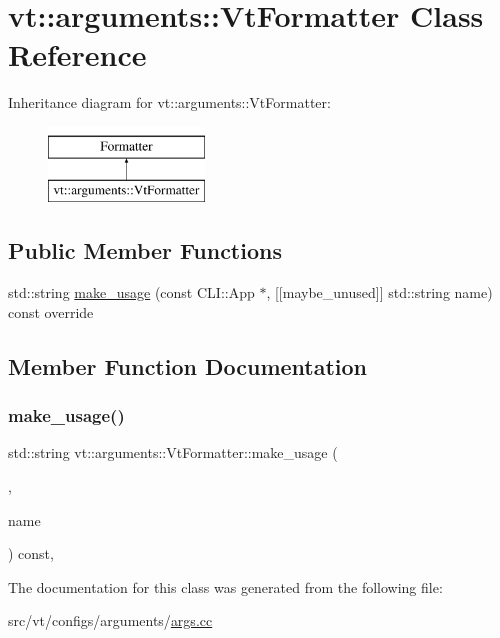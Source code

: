\hypertarget{classvt_1_1arguments_1_1_vt_formatter}{}\section{vt\+:\+:arguments\+:\+:Vt\+Formatter Class Reference}
\label{classvt_1_1arguments_1_1_vt_formatter}
Inheritance diagram for vt\+:\+:arguments\+:\+:Vt\+Formatter\+:\begin{figure}[H]
\begin{center}
\leavevmode
\includegraphics[height=2.000000cm]{classvt_1_1arguments_1_1_vt_formatter}
\end{center}
\end{figure}
\subsection*{Public Member Functions}
\begin{DoxyCompactItemize}
\item 
std\+::string \hyperlink{classvt_1_1arguments_1_1_vt_formatter_ad095bce396cd6c05d0dd4856395451c3}{make\+\_\+usage} (const C\+L\+I\+::\+App $\ast$, \mbox{[}\mbox{[}maybe\+\_\+unused\mbox{]}\mbox{]} std\+::string name) const override
\end{DoxyCompactItemize}


\subsection{Member Function Documentation}
\mbox{\label{classvt_1_1arguments_1_1_vt_formatter_ad095bce396cd6c05d0dd4856395451c3}} 
\subsubsection{\texorpdfstring{make\+\_\+usage()}{make\_usage()}}
{\footnotesize\ttfamily std\+::string vt\+::arguments\+::\+Vt\+Formatter\+::make\+\_\+usage (\begin{DoxyParamCaption}\item[{const C\+L\+I\+::\+App $\ast$}]{,  }\item[{\mbox{[}\mbox{[}maybe\+\_\+unused\mbox{]} \mbox{]} std\+::string}]{name }\end{DoxyParamCaption}) const\hspace{0.3cm}{\ttfamily [inline]}, {\ttfamily [override]}}



The documentation for this class was generated from the following file\+:\begin{DoxyCompactItemize}
\item 
src/vt/configs/arguments/\hyperlink{args_8cc}{args.\+cc}\end{DoxyCompactItemize}
